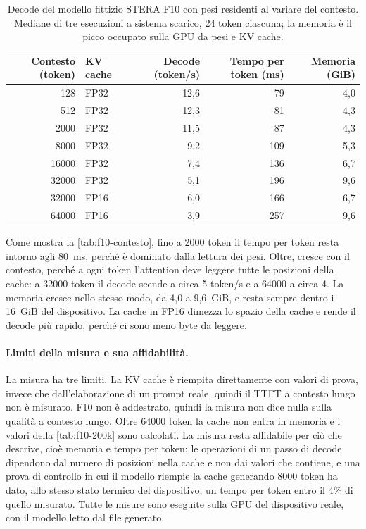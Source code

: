 \begin{table}[H]
\centering
\small
\begin{tabular}{rlrrr}
\toprule
Contesto (token) & KV cache & Decode (token/s) & Tempo per token (ms) & Memoria (GiB) \\
\midrule
128 & FP32 & 12,6 & 79 & 4,0 \\
512 & FP32 & 12,3 & 81 & 4,3 \\
\num{2000} & FP32 & 11,5 & 87 & 4,3 \\
\num{8000} & FP32 & 9,2 & 109 & 5,3 \\
\num{16000} & FP32 & 7,4 & 136 & 6,7 \\
\num{32000} & FP32 & 5,1 & 196 & 9,6 \\
\num{32000} & FP16 & 6,0 & 166 & 6,7 \\
\num{64000} & FP16 & 3,9 & 257 & 9,6 \\
\bottomrule
\end{tabular}
\caption{Decode del modello fittizio STERA F10 con pesi residenti al variare del contesto. Mediane di tre esecuzioni a sistema scarico, 24 token ciascuna; la memoria è il picco occupato sulla GPU da pesi e KV cache.}
\label{tab:f10-contesto}
\end{table}

Come mostra la \autoref{tab:f10-contesto}, fino a \num{2000} token il tempo per token resta intorno agli 80~ms, perché è dominato dalla lettura dei pesi. Oltre, cresce con il contesto, perché a ogni token l'attention deve leggere tutte le posizioni della cache: a \num{32000} token il decode scende a circa 5 token/s e a \num{64000} a circa 4. La memoria cresce nello stesso modo, da 4,0 a 9,6~GiB, e resta sempre dentro i 16~GiB del dispositivo. La cache in FP16 dimezza lo spazio della cache e rende il decode più rapido, perché ci sono meno byte da leggere.

\paragraph{Limiti della misura e sua affidabilità.} La misura ha tre limiti. La KV cache è riempita direttamente con valori di prova, invece che dall'elaborazione di un prompt reale, quindi il TTFT a contesto lungo non è misurato. F10 non è addestrato, quindi la misura non dice nulla sulla qualità a contesto lungo. Oltre \num{64000} token la cache non entra in memoria e i valori della \autoref{tab:f10-200k} sono calcolati. La misura resta affidabile per ciò che descrive, cioè memoria e tempo per token: le operazioni di un passo di decode dipendono dal numero di posizioni nella cache e non dai valori che contiene, e una prova di controllo in cui il modello riempie la cache generando \num{8000} token ha dato, allo stesso stato termico del dispositivo, un tempo per token entro il $4\%$ di quello misurato. Tutte le misure sono eseguite sulla GPU del dispositivo reale, con il modello letto dal file generato.

